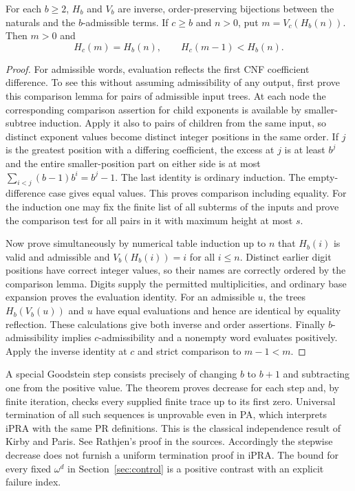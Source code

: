\begin{theorem}
For each $b\ge2$, $H_b$ and $V_b$ are inverse, order-preserving bijections between the naturals and the $b$-admissible terms. If $c\ge b$ and $n>0$, put $m=V_c(H_b(n))$. Then $m>0$ and
\[
       H_c(m)=H_b(n),\qquad H_c(m-1)<H_b(n).
\]
\end{theorem}
\begin{proof}
For admissible words, evaluation reflects the first CNF coefficient difference. To see this without assuming admissibility of any output, first prove this comparison lemma for pairs of admissible input trees. At each node the corresponding comparison assertion for child exponents is available by smaller-subtree induction. Apply it also to pairs of children from the same input, so distinct exponent values become distinct integer positions in the same order. If $j$ is the greatest position with a differing coefficient, the excess at $j$ is at least $b^j$ and the entire smaller-position part on either side is at most $\sum_{i<j}(b-1)b^i=b^j-1$. The last identity is ordinary induction. The empty-difference case gives equal values. This proves comparison including equality. For the induction one may fix the finite list of all subterms of the inputs and prove the comparison test for all pairs in it with maximum height at most $s$.

Now prove simultaneously by numerical table induction up to $n$ that $H_b(i)$ is valid and admissible and $V_b(H_b(i))=i$ for all $i\le n$. Distinct earlier digit positions have correct integer values, so their names are correctly ordered by the comparison lemma. Digits supply the permitted multiplicities, and ordinary base expansion proves the evaluation identity. For an admissible $u$, the trees $H_b(V_b(u))$ and $u$ have equal evaluations and hence are identical by equality reflection. These calculations give both inverse and order assertions. Finally $b$-admissibility implies $c$-admissibility and a nonempty word evaluates positively. Apply the inverse identity at $c$ and strict comparison to $m-1<m$.
\end{proof}
A special Goodstein step consists precisely of changing $b$ to $b+1$ and subtracting one from the positive value. The theorem proves decrease for each step and, by finite iteration, checks every supplied finite trace up to its first zero. Universal termination of all such sequences is unprovable even in PA, which interprets iPRA with the same PR definitions. This is the classical independence result of Kirby and Paris. See Rathjen's proof in the sources. Accordingly the stepwise decrease does not furnish a uniform termination proof in iPRA. The bound for every fixed $\omega^d$ in Section~\ref{sec:control} is a positive contrast with an explicit failure index.

